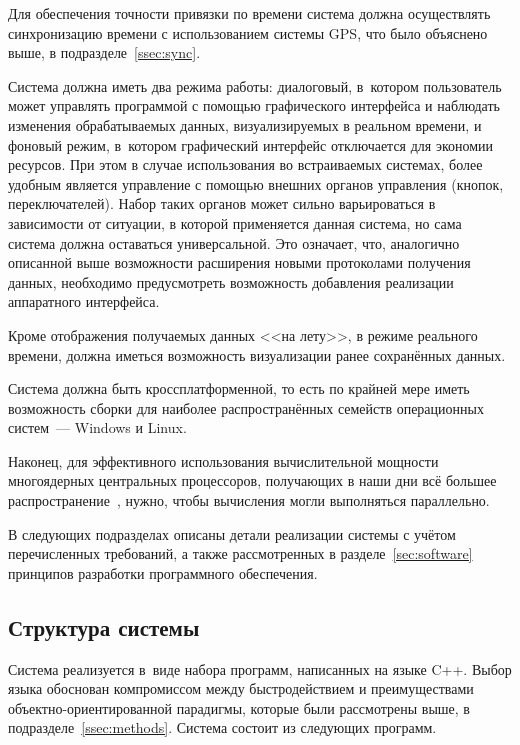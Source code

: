 \documentclass[a4paper, 14pt, titlepage]{extarticle}
\newcommand{\eng}[1]{\foreignlanguage{english}{#1}}
\begin{document}
  Для обеспечения точности привязки по времени система должна осуществлять синхронизацию времени с
  использованием системы GPS, что было объяснено выше, в подразделе~\ref{ssec:sync}.

  Система должна иметь два режима работы: диалоговый, в~котором пользователь может управлять
  программой с помощью графического интерфейса и наблюдать изменения обрабатываемых данных,
  визуализируемых в реальном времени, и фоновый режим, в~котором графический интерфейс отключается
  для экономии ресурсов.
  При этом в случае использования во встраиваемых системах, более удобным является управление с
  помощью внешних органов управления (кнопок, переключателей). Набор таких органов может
  сильно варьироваться в зависимости от ситуации, в которой применяется данная система, но сама
  система должна оставаться универсальной. Это означает, что, аналогично описанной выше возможности
  расширения новыми протоколами получения данных, необходимо предусмотреть возможность добавления
  реализации аппаратного интерфейса.

  Кроме отображения получаемых данных <<на лету>>, в режиме реального времени, должна иметься
  возможность визуализации ранее сохранённых данных.

  Система должна быть кроссплатформенной, то есть по крайней мере иметь возможность сборки для
  наиболее распространённых семейств операционных систем~--- \eng{Windows} и \eng{Linux}.

  Наконец, для эффективного использования вычислительной мощности многоядерных центральных
  процессоров, получающих в наши дни всё большее распространение~\cite{steam-hardware}, нужно, чтобы
  вычисления могли выполняться параллельно.

  В следующих подразделах описаны детали реализации системы с учётом перечисленных требований, а
  также рассмотренных в разделе~\ref{sec:software} принципов разработки программного обеспечения.

  \subsection{Структура системы}\label{ssec:structure}

  Система реализуется в~виде набора программ, написанных на языке C++. Выбор языка обоснован
  компромиссом между быстродействием и преимуществами объектно-ориентированной парадигмы, которые
  были рассмотрены выше, в подразделе~\ref{ssec:methods}. Система состоит из следующих программ.
\end{document}
